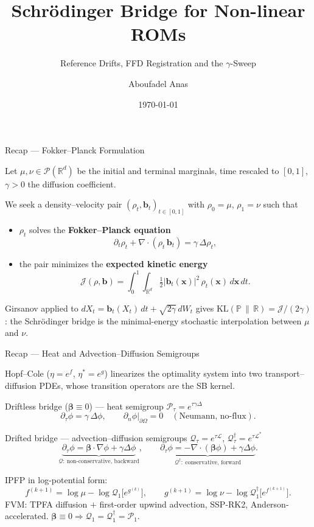 \documentclass[aspectratio=169]{beamer}
\title[Schrödinger Bridge ROMs]{Schrödinger Bridge for Non-linear ROMs}
\subtitle{Reference Drifts, FFD Registration and the $\gamma$-Sweep}
\author{Aboufadel Anas}
\date{\today}
\newcommand{\bt}{\mathbf{b}}
\newcommand{\xv}{\mathbf{x}}
\newcommand{\grad}{\nabla}
\newcommand{\dive}{\nabla\!\cdot}
\newcommand{\Qcal}{\mathcal{Q}}
\newcommand{\Pcal}{\mathcal{P}}
\begin{document}
\begin{frame}
    \titlepage
\end{frame}
\begin{frame}{Recap — Fokker--Planck Formulation}

Let $\mu,\nu\in\mathcal{P}(\mathbb{R}^d)$ be the initial and terminal marginals,
time rescaled to $[0,1]$, $\gamma>0$ the diffusion coefficient.

We seek a density--velocity pair $(\rho_t,\bt_t)_{t\in[0,1]}$ with
$\rho_0=\mu$, $\rho_1=\nu$ such that
\begin{itemize}
    \item $\rho_t$ solves the \textbf{Fokker--Planck equation}
    \[
        \partial_t \rho_t + \dive(\rho_t\,\bt_t) = \gamma\,\Delta \rho_t ,
    \]
    \item the pair minimizes the \textbf{expected kinetic energy}
    \[
        \mathcal{J}(\rho,\bt)=\int_0^1\!\!\int_{\mathbb{R}^d}\tfrac12|\bt_t(\xv)|^2\,\rho_t(\xv)\,d\xv\,dt .
    \]
\end{itemize}

Girsanov applied to $dX_t=\bt_t(X_t)\,dt+\sqrt{2\gamma}\,dW_t$ gives
$\mathrm{KL}(\mathbb{P}\,\|\,\mathbb{R})=\mathcal{J}/(2\gamma)$: the Schrödinger
bridge is the minimal-energy stochastic interpolation between $\mu$ and $\nu$.

\end{frame}
\begin{frame}{Recap — Heat and Advection--Diffusion Semigroups}

Hopf--Cole ($\eta=e^{f}$, $\eta^\ast=e^{g}$) linearizes the optimality system into
two transport--diffusion PDEs, whose transition operators are the SB kernel.

\begin{block}{Driftless bridge ($\boldsymbol{\beta}\equiv0$) — heat semigroup $\Pcal_\tau=e^{\tau\gamma\Delta}$}
\[
    \partial_\tau\phi=\gamma\,\Delta\phi,\qquad \partial_n\phi|_{\partial\Omega}=0
    \quad(\text{Neumann, no-flux}).
\]
\end{block}

\begin{block}{Drifted bridge — advection--diffusion semigroups $\Qcal_\tau=e^{\tau\mathcal{L}}$, $\Qcal^{\dagger}_\tau=e^{\tau\mathcal{L}^\ast}$}
\[
    \underbrace{\partial_\tau\phi=\boldsymbol{\beta}\cdot\grad\phi+\gamma\Delta\phi}_{\Qcal:\ \text{non-conservative, backward}},
    \qquad
    \underbrace{\partial_\tau\phi=-\dive(\boldsymbol{\beta}\phi)+\gamma\Delta\phi}_{\Qcal^{\dagger}:\ \text{conservative, forward}} .
\]
\end{block}

IPFP in log-potential form:
\[
    f^{(k+1)}=\log\mu-\log\Qcal_1\!\bigl[e^{g^{(k)}}\bigr],
    \qquad
    g^{(k+1)}=\log\nu-\log\Qcal^{\dagger}_1\!\bigl[e^{f^{(k+1)}}\bigr].
\]
FVM: TPFA diffusion $+$ first-order upwind advection, SSP-RK2, Anderson-accelerated.
$\boldsymbol{\beta}\equiv0\Rightarrow\Qcal_1=\Qcal^{\dagger}_1=\Pcal_1$.

\end{frame}
\end{document}
